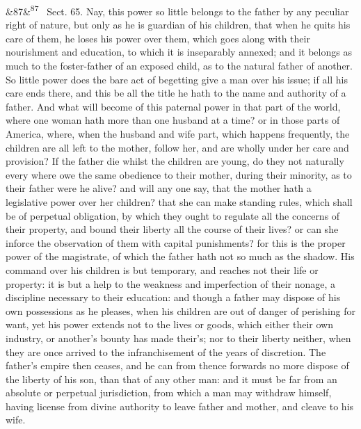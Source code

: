 \documentclass[12pt]{article}
\newcommand{\para}[1][]{\par\noindent\ifx&#1&\else\textsuperscript{\footnotesize #1}~\fi}
\begin{document}
\para[87] Sect. 65. Nay, this power so little belongs to the father by any peculiar right of nature, but only as he is guardian of his children, that when he quits his care of them, he loses his power over them, which goes along with their nourishment and education, to which it is inseparably annexed; and it belongs as much to the foster-father of an exposed child, as to the natural father of another. So little power does the bare act of begetting give a man over his issue; if all his care ends there, and this be all the title he hath to the name and authority of a father. And what will become of this paternal power in that part of the world, where one woman hath more than one husband at a time? or in those parts of America, where, when the husband and wife part, which happens frequently, the children are all left to the mother, follow her, and are wholly under her care and provision? If the father die whilst the children are young, do they not naturally every where owe the same obedience to their mother, during their minority, as to their father were he alive? and will any one say, that the mother hath a legislative power over her children? that she can make standing rules, which shall be of perpetual obligation, by which they ought to regulate all the concerns of their property, and bound their liberty all the course of their lives? or can she inforce the observation of them with capital punishments? for this is the proper power of the magistrate, of which the father hath not so much as the shadow. His command over his children is but temporary, and reaches not their life or property: it is but a help to the weakness and imperfection of their nonage, a discipline necessary to their education: and though a father may dispose of his own possessions as he pleases, when his children are out of danger of perishing for want, yet his power extends not to the lives or goods, which either their own industry, or another's bounty has made their's; nor to their liberty neither, when they are once arrived to the infranchisement of the years of discretion. The father's empire then ceases, and he can from thence forwards no more dispose of the liberty of his son, than that of any other man: and it must be far from an absolute or perpetual jurisdiction, from which a man may withdraw himself, having license from divine authority to leave father and mother, and cleave to his wife.
\end{document}
